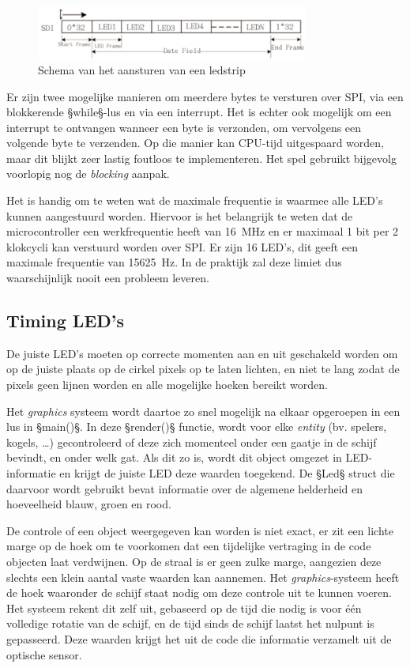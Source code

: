 \documentclass[12pt]{ugentreport}
\begin{document}
\begin{figure}
  \centering
  \includegraphics[width=0.8\textwidth]{img/ledcontrol.png}
  \caption{Schema van het aansturen van een ledstrip}
  \label{fig:ledcontrol}
\end{figure}

Er zijn twee mogelijke manieren om meerdere bytes te versturen over SPI,
via een blokkerende §while§-lus en via een interrupt.
Het is echter ook mogelijk om een interrupt te ontvangen wanneer een byte is
verzonden,
om vervolgens een volgende byte te verzenden. Op die manier kan CPU-tijd
uitgespaard worden, maar dit blijkt zeer lastig foutloos te implementeren.
Het spel gebruikt bijgevolg voorlopig nog de \emph{blocking} aanpak.

Het is handig om te weten wat de maximale frequentie is waarmee alle LED's
kunnen aangestuurd worden.
Hiervoor is het belangrijk te weten dat de microcontroller
een werkfrequentie heeft van \SI{16}{\mega\hertz}
en er maximaal 1 bit per 2 klokcycli kan verstuurd worden over SPI.
Er zijn 16 LED's, dit geeft een maximale frequentie van \SI{15625}{\hertz}.
In de praktijk zal deze limiet dus waarschijnlijk nooit een probleem leveren.

\subsection{Timing LED's}
\label{sec:ledtiming}
De juiste LED's moeten op correcte momenten aan en uit geschakeld worden
om op de juiste plaats op de cirkel pixels op te laten lichten,
en niet te lang zodat de pixels geen lijnen worden en alle mogelijke hoeken
bereikt worden.

Het \emph{graphics} systeem wordt daartoe zo snel mogelijk na elkaar opgeroepen
in een lus in §main()§. In deze §render()§ functie, wordt voor elke
\emph{entity} (bv. spelers, kogels, \dots) gecontroleerd of deze zich momenteel
onder een gaatje in de schijf bevindt, en onder welk gat. Als dit zo is, wordt
dit object omgezet in LED-informatie en krijgt de juiste LED deze waarden
toegekend. De §Led§ struct die daarvoor wordt gebruikt bevat informatie over de
algemene helderheid en hoeveelheid blauw, groen en rood.

De controle of een object weergegeven kan worden is niet exact, er zit een
lichte marge op de hoek om te voorkomen dat een tijdelijke vertraging in de code
objecten laat verdwijnen. Op de straal is er geen zulke marge, aangezien deze
slechts een klein aantal vaste waarden kan aannemen. Het \emph{graphics}-systeem
heeft de hoek waaronder de schijf staat nodig om deze controle uit te kunnen
voeren. Het systeem rekent dit zelf uit, gebaseerd op de tijd die nodig is voor
één volledige rotatie van de schijf, en de tijd sinds de schijf laatst het
nulpunt is gepasseerd. Deze waarden krijgt het uit de code die informatie
verzamelt uit de optische sensor.
\end{document}
